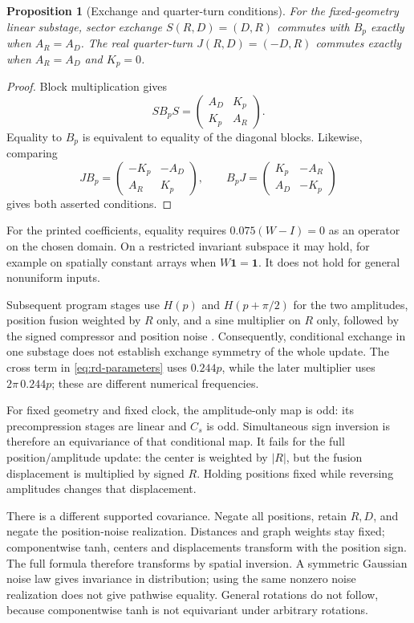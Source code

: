 \documentclass[11pt,a4paper]{article}
\newtheorem{proposition}[theorem]{Proposition}
\theoremstyle{definition}
\numberwithin{equation}{section}
\begin{document}
\begin{proposition}[Exchange and quarter-turn conditions]
\label{prop:rd}
For the fixed-geometry linear substage, sector exchange
$S(R,D)=(D,R)$ commutes with $B_p$ exactly when $A_R=A_D$.
The real quarter-turn $J(R,D)=(-D,R)$ commutes exactly when
$A_R=A_D$ and $K_p=0$.
\end{proposition}
\begin{proof}
Block multiplication gives
\[
 SB_pS=\begin{pmatrix}A_D&K_p\\K_p&A_R\end{pmatrix}.
\]
Equality to $B_p$ is equivalent to equality of the diagonal blocks.
Likewise, comparing
\[
 JB_p=\begin{pmatrix}-K_p&-A_D\\A_R&K_p\end{pmatrix},
 \qquad
 B_pJ=\begin{pmatrix}K_p&-A_R\\A_D&-K_p\end{pmatrix}
\]
gives both asserted conditions.
\end{proof}
For the printed coefficients, equality requires $0.075(W-I)=0$ as
an operator on the chosen domain. On a restricted invariant subspace it
may hold, for example on spatially constant arrays when $W\mathbf1=\mathbf1$.
It does not hold for general nonuniform inputs.

Subsequent program stages use $H(p)$ and $H(p+\pi/2)$ for the two
amplitudes, position fusion weighted by $R$ only, and a sine multiplier
on $R$ only, followed by the signed compressor and position noise
\cite[lines 162--202]{Infinity}.
Consequently, conditional exchange in one substage does not establish
exchange symmetry of the whole update. The cross term in
\eqref{eq:rd-parameters} uses $0.244p$, while the later multiplier uses
$2\pi\,0.244p$; these are different numerical frequencies.

For fixed geometry and fixed clock, the amplitude-only map is odd:
its precompression stages are linear and $C_s$ is odd.
Simultaneous sign inversion is therefore an equivariance of that
conditional map. It fails for the full position/amplitude update:
the center is weighted by $|R|$, but the fusion displacement is multiplied
by signed $R$. Holding positions fixed while reversing amplitudes changes
that displacement.

There is a different supported covariance. Negate all positions, retain
$R,D$, and negate the position-noise realization. Distances and graph
weights stay fixed; componentwise tanh, centers and displacements transform
with the position sign. The full formula therefore transforms by spatial
inversion. A symmetric Gaussian noise law gives invariance in distribution;
using the same nonzero noise realization does not give pathwise equality.
General rotations do not follow, because componentwise tanh is not
equivariant under arbitrary rotations.
\end{document}
